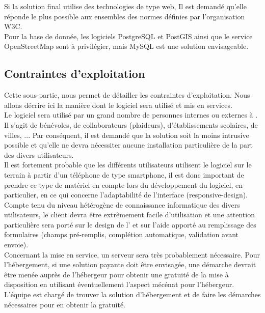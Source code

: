 Si la solution final utilise des technologies de type web, Il est demandé qu'elle réponde le plus possible aux ensembles des normes définies par l'organisation W3C.\\

Pour la base de donnée, les logiciels PostgreSQL et PostGIS ainsi que le service OpenStreetMap sont à privilégier, mais MySQL est une solution envisageable.\\





\subsection{Contraintes d'exploitation}
Cette sous-partie, nous permet de détailler les contraintes d'exploitation. Nous allons décrire ici la manière dont le logiciel sera utilisé et mis en services.\\

Le logiciel sera utilisé par un grand nombre de personnes internes ou externes à \nomClient{}. Il s'agit de bénévoles, de collaborateurs (plaideurs), d'établissements scolaires, de villes, ... Par conséquent, il est demandé que la solution soit la moins intrusive possible et qu'elle ne devra nécessiter aucune installation particulière de la part des divers utilisateurs.\\

Il est fortement probable que les différents utilisateurs utilisent le logiciel sur le terrain à partir d'un téléphone de type smartphone, il est donc important de prendre ce type de matériel en compte lors du développement du logiciel, en particulier, en ce qui concerne l'adaptabilité de l'interface (responsive-design).\\

Compte tenu du niveau hétérogène de connaissance informatique des divers utilisateurs, le client devra être extrêmement facile d'utilisation et une attention particulière sera porté sur le design de l'\IHM{} et sur l'aide apporté au remplissage des formulaires (champs pré-remplis, complétion automatique, validation avant envoie).\\

Concernant la mise en service, un serveur sera très probablement nécessaire. Pour l'hébergement, si une solution payante doit être envisagée, une démarche devrait être menée auprès de l'hébergeur pour obtenir une gratuité de la mise à disposition en utilisant éventuellement l'aspect mécénat pour l'hébergeur. L'équipe \PICCourt{} est chargé de trouver la solution d'hébergement et de faire les démarches nécessaires pour en obtenir la gratuité.\\

